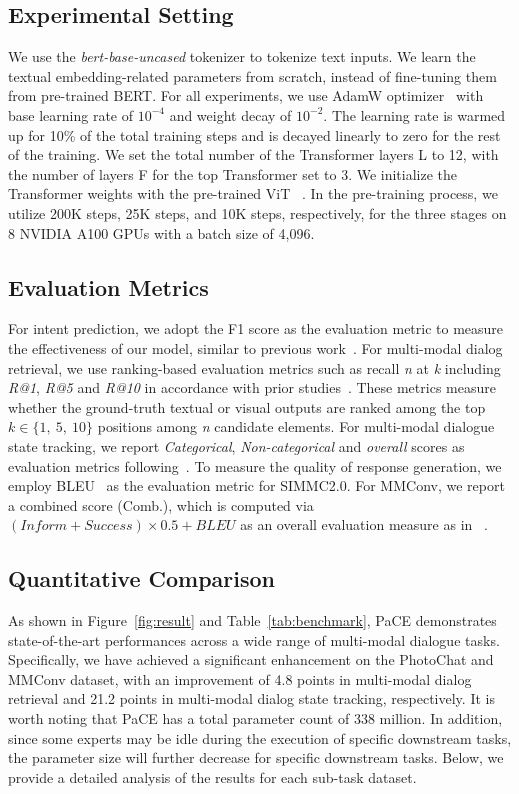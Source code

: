 \documentclass[11pt]{article}
\begin{document}
\subsection{Experimental Setting}
We use the \textit{bert-base-uncased} tokenizer to tokenize text inputs. We learn the textual embedding-related parameters from scratch, instead of fine-tuning them from pre-trained BERT.
For all experiments, we use AdamW optimizer~\citep{loshchilov2017decoupled} with base learning rate of $10^{-4}$ and weight decay of $10^{-2}$. The learning rate is warmed up for 10\% of the total training steps and is decayed linearly to zero for the rest of the training. We set the total number of the Transformer layers L to 12, with the number of layers F for the top Transformer set to 3.
We initialize the Transformer weights with the pre-trained ViT ~\citep{dosovitskiy2020image}. 
In the pre-training process, we utilize 200K steps, 25K steps, and 10K steps, respectively, for the three stages on 8 NVIDIA A100 GPUs with a batch size of 4,096.


\subsection{Evaluation Metrics}
 For intent prediction, we adopt the F1 score as the evaluation metric to measure the effectiveness of our model, similar to previous work~\cite{zang2021photochat}. For multi-modal dialog retrieval, we use ranking-based evaluation metrics such as recall \textit{n} at \textit{k} including \textit{R@1}, \textit{R@5} and \textit{R@10} in accordance with prior studies~\citep{zang2021photochat, shuster2018image}. These metrics measure whether the ground-truth textual or visual outputs are ranked among the top $ k \in \{1,\ 5,\ 10\}$ positions among \textit{n} candidate elements. For multi-modal dialogue state tracking, we report \textit{Categorical}, \textit{Non-categorical} and \textit{overall} scores as evaluation metrics following~\cite{liao2021mmconv}. To measure the quality of response generation, we employ BLEU~\cite {papineni2002bleu} as the evaluation metric for SIMMC2.0. For MMConv, we report a combined score (Comb.), which is computed via $(Inform + Success)\times 0.5+BLEU$ as an overall evaluation measure as in ~\cite{mehri2019structured}. 




\subsection{Quantitative Comparison}
As shown in Figure~\ref{fig:result} and Table~\ref{tab:benchmark}, PaCE  demonstrates state-of-the-art performances across a wide range of multi-modal dialogue tasks. Specifically, we have achieved a significant enhancement on the PhotoChat and MMConv dataset, with an improvement of 4.8 points in multi-modal dialog retrieval and 21.2 points in multi-modal dialog state tracking, respectively. It is worth noting that PaCE has a total parameter count of 338 million. In addition, since some experts may be idle during the execution of specific downstream tasks, the parameter size will further decrease for specific downstream tasks. Below, we provide a detailed analysis of the results for each sub-task dataset.
\end{document}
